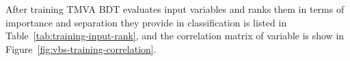 
After training \gls{TMVA} \gls{BDT} evaluates input variables
and ranks them in terms of importance and separation
they provide in classification is listed in Table~\ref{tab:training-input-rank},
and the correlation matrix of variable is show in Figure~\ref{fig:vbs-training-correlation}.


